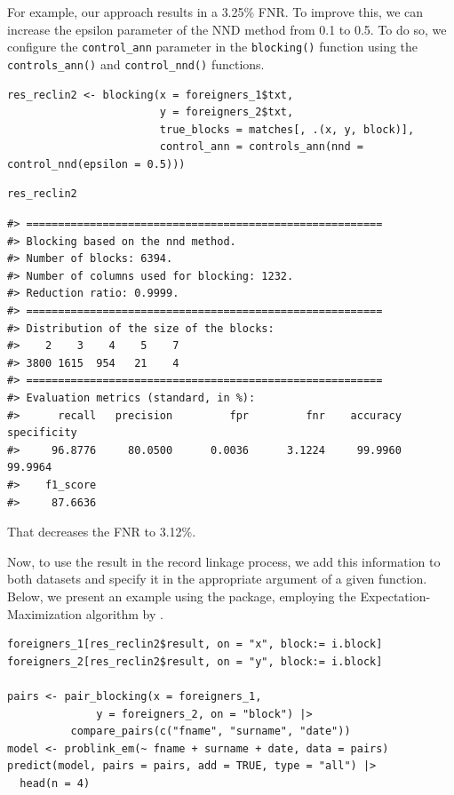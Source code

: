 For example, our approach results in
a 3.25\% FNR. To improve
this, we can increase the epsilon parameter of the NND method from 0.1
to 0.5. To do so, we configure the \texttt{control\_ann} parameter in the
\texttt{blocking()} function using the \texttt{controls\_ann()} and \texttt{control\_nnd()}
functions.

\begin{verbatim}
res_reclin2 <- blocking(x = foreigners_1$txt,
                        y = foreigners_2$txt,
                        true_blocks = matches[, .(x, y, block)],
                        control_ann = controls_ann(nnd = control_nnd(epsilon = 0.5)))
\end{verbatim}


\begin{verbatim}
res_reclin2
\end{verbatim}

\begin{verbatim}
#> ========================================================
#> Blocking based on the nnd method.
#> Number of blocks: 6394.
#> Number of columns used for blocking: 1232.
#> Reduction ratio: 0.9999.
#> ========================================================
#> Distribution of the size of the blocks:
#>    2    3    4    5    7 
#> 3800 1615  954   21    4 
#> ========================================================
#> Evaluation metrics (standard, in %):
#>      recall   precision         fpr         fnr    accuracy specificity 
#>     96.8776     80.0500      0.0036      3.1224     99.9960     99.9964 
#>    f1_score 
#>     87.6636
\end{verbatim}

That decreases the FNR to
3.12\%.

Now, to use the result in the record linkage process, we add this
information to both datasets and specify it in the appropriate argument
of a given function. Below, we present an example using the
 package, employing the Expectation-Maximization
algorithm by \citet{fellegi1969theory}.

\begin{verbatim}
foreigners_1[res_reclin2$result, on = "x", block:= i.block]
foreigners_2[res_reclin2$result, on = "y", block:= i.block]

pairs <- pair_blocking(x = foreigners_1, 
              y = foreigners_2, on = "block") |>
          compare_pairs(c("fname", "surname", "date")) 
model <- problink_em(~ fname + surname + date, data = pairs)
predict(model, pairs = pairs, add = TRUE, type = "all") |>
  head(n = 4)
\end{verbatim}

